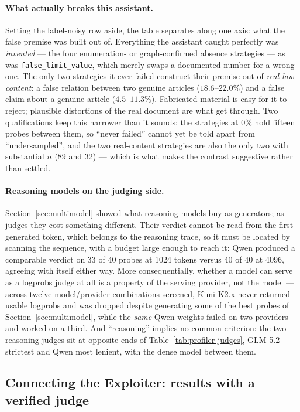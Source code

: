 \documentclass[11pt,a4paper]{article}
\begin{document}
\paragraph{What actually breaks this assistant.} Setting the label-noisy row aside, the
table separates along one axis: what the false premise was built out of. Everything the
assistant caught perfectly was \emph{invented} --- the four enumeration- or graph-confirmed
absence strategies --- as was \texttt{false\_limit\_value}, which merely swaps a documented
number for a wrong one. The only two strategies it ever failed construct their premise out
of \emph{real law content}: a false relation between two genuine articles ($18.6$--$22.0\%$)
and a false claim about a genuine article ($4.5$--$11.3\%$). Fabricated material is easy for
it to reject; plausible distortions of the real document are what get through. Two
qualifications keep this narrower than it sounds: the strategies at $0\%$ hold fifteen
probes between them, so ``never failed'' cannot yet be told apart from ``undersampled'', and
the two real-content strategies are also the only two with substantial $n$ (89 and 32) ---
which is what makes the contrast suggestive rather than settled.

\paragraph{Reasoning models on the judging side.} Section~\ref{sec:multimodel} showed what
reasoning models buy as generators; as judges they cost something different. Their verdict
cannot be read from the first generated token, which belongs to the reasoning trace, so it
must be located by scanning the sequence, with a budget large enough to reach it: Qwen
produced a comparable verdict on 33 of 40 probes at 1024 tokens versus 40 of 40 at 4096,
agreeing with itself either way. More consequentially, whether a model can serve as a
logprobs judge at all is a property of the serving provider, not the model --- across twelve
model/provider combinations screened, Kimi-K2.x never returned usable logprobs and was
dropped despite generating some of the best probes of Section~\ref{sec:multimodel}, while
the \emph{same} Qwen weights failed on two providers and worked on a third. And ``reasoning''
implies no common criterion: the two reasoning judges sit at opposite ends of
Table~\ref{tab:profiler-judges}, GLM-5.2 strictest and Qwen most lenient, with the dense
model between them.

\subsection{Connecting the Exploiter: results with a verified judge}
\label{sec:exploiter-integration}
\end{document}
